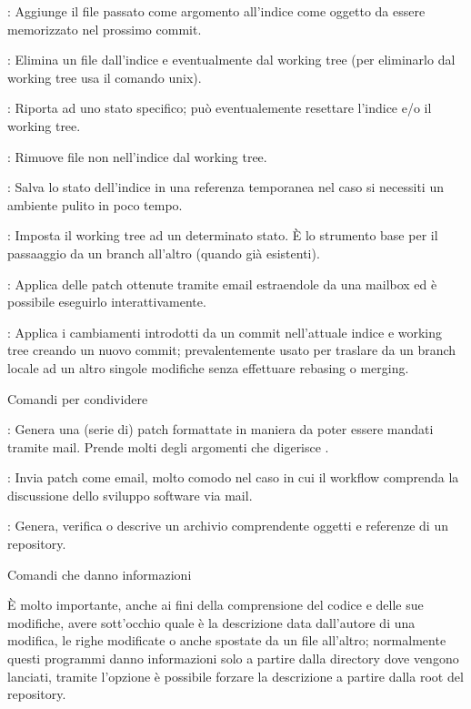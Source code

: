 \elemento{}: Aggiunge il file passato come argomento all'indice come
oggetto da essere memorizzato nel prossimo commit.

\elemento{}: Elimina un file dall'indice e eventualmente dal working tree
(per eliminarlo dal working tree usa il comando  unix).

\elemento{}: Riporta  ad uno stato specifico; pu\`o
eventualemente resettare l'indice e/o il working tree.

\elemento{}: Rimuove file non nell'indice dal working tree.

\elemento{}: Salva lo stato dell'indice in una referenza temporanea
nel caso si necessiti un ambiente pulito in poco tempo.

\elemento{}: Imposta il working tree ad un determinato stato. \`E
lo strumento base per il passaaggio da un branch all'altro (quando gi\`a
esistenti).

\elemento{}: Applica delle patch ottenute tramite email estraendole da
una mailbox ed \`e possibile eseguirlo interattivamente.

\elemento{}: Applica i cambiamenti introdotti da un commit
nell'attuale indice e working tree creando un nuovo commit; prevalentemente
usato per traslare da un branch locale ad un altro singole modifiche senza
effettuare rebasing o merging.

\sezione Comandi per condividere

\elemento{}: Genera una (serie di) patch formattate in
maniera da poter essere mandati tramite mail. Prende molti degli argomenti che
digerisce .

\elemento{}: Invia patch come email, molto comodo nel caso in cui
il workflow comprenda la discussione dello sviluppo software via mail.

\elemento{}: Genera, verifica o descrive un archivio comprendente
oggetti e referenze di un repository.

\sezione Comandi che danno informazioni

\`E molto importante, anche ai fini della comprensione del codice e delle sue
modifiche, avere sott'occhio quale \`e la descrizione data dall'autore di una
modifica, le righe modificate o anche spostate da un file all'altro; normalmente
questi programmi danno informazioni solo a partire dalla directory dove vengono
lanciati, tramite l'opzione  \`e possibile forzare la
descrizione a partire dalla root del repository.

